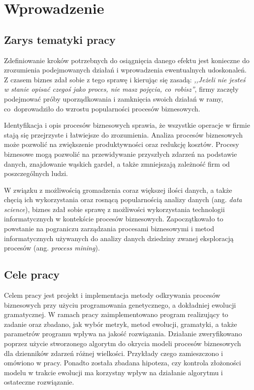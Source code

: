 \chapter{Wprowadzenie}
\label{cha:wprowadzenie}


\section{Zarys tematyki pracy}
\label{sec:zarysPracy}

Zdefiniowanie kroków potrzebnych do osiągnięcia danego efektu jest konieczne do zrozumienia podejmowanych działań i wprowadzenia ewentualnych udoskonaleń. Z czasem biznes zdał sobie z tego sprawę i kierując się zasadą: \textit{,,Jeżeli nie jesteś w stanie opisać czegoś jako proces, nie masz pojęcia, co~robisz''}, firmy zaczęły podejmować próby uporządkowania i zamknięcia swoich działań w ramy, co~doprowadziło do wzrostu popularności procesów biznesowych.

Identyfikacja i opis procesów biznesowych sprawia, że wszystkie operacje w firmie stają się przejrzyste i łatwiejsze do zrozumienia. Analiza procesów biznesowych może pozwolić na zwiększenie produktywności oraz redukcję kosztów. Procesy biznesowe mogą pozwolić na przewidywanie przyszłych zdarzeń na podstawie danych, znajdowanie wąskich gardeł, a także zmniejszają zależność firm od poszczególnych ludzi.

W związku z możliwością gromadzenia coraz większej ilości danych, a także chęcią ich wykorzystania oraz rosnącą popularnością analizy danych (ang. \textit{data science}), biznes zdał sobie sprawę z możliwości wykorzystania technologii informatycznych w kontekście procesów biznesowych. Zapoczątkowało to powstanie na pograniczu zarządzania procesami biznesowymi i metod informatycznych używanych do analizy danych dziedziny zwanej eksploracją procesów (ang. \textit{process mining}).
 
\section{Cele pracy}
\label{sec:celePracy}

Celem pracy jest projekt i implementacja metody odkrywania procesów biznesowych przy użyciu programowania genetycznego, a dokładniej ewolucji gramatycznej. W ramach pracy zaimplementowano program realizujący to zadanie oraz zbadano, jak wybór metryk, metod ewolucji, gramatyki, a także parametrów programu wpływa na jakość rozwiązania. Działanie zweryfikowano poprzez użycie stworzonego algorytm do okrycia modeli procesów biznesowych dla dzienników zdarzeń różnej wielkości. Przykłady czego zamieszczono i omówiono w pracy. Ponadto została zbadana hipoteza, czy kontrola złożoności modelu w trakcie ewolucji ma korzystny wpływ na działanie algorytmu i ostateczne rozwiązanie.

